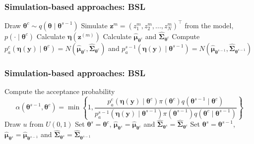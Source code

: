 \documentclass[12pt, compress]{beamer}
\begin{document}
\begin{frame}
	\frametitle{Simulation-based approaches: BSL}
\begin{algorithm}[H]
	\caption{Bayesian synthetic likelihood}\label{BSL0}
	\begin{algorithmic}
			\State Draw $\boldsymbol{\theta}^c\sim q(\boldsymbol{\theta}\mid \boldsymbol{\theta}^{s-1})$
				\State Simulate ${\boldsymbol z}^{m}=(z_{1}^{m},z_{2}^{m},...,z_{N}^{m})^{\top}$ from the model, $p(\cdot\mid{\boldsymbol{\theta} }^c)$
				\State Calculate $\boldsymbol{\eta}(\boldsymbol{z}^{(m)})$
			\EndFor 			 
			\State Calculate $\hat{\boldsymbol{\mu}}_{\boldsymbol{\theta}^c}$ and $\hat{\boldsymbol{\Sigma}}_{\boldsymbol{\theta}^c}$
			\State Compute $p_a^c(\boldsymbol{\eta}(\boldsymbol{y})\mid \boldsymbol{\theta}^c) = N(\hat{\boldsymbol{\mu}}_{\boldsymbol{\theta}^c}, \hat{\boldsymbol{\Sigma}}_{\boldsymbol{\theta}^c})$ and $p_a^{s-1}(\boldsymbol{\eta}(\boldsymbol{y})\mid \boldsymbol{\theta}^{s-1}) = N(\hat{\boldsymbol{\mu}}_{\boldsymbol{\theta}^{s-1}}, \hat{\boldsymbol{\Sigma}}_{\boldsymbol{\theta}^{s-1}})$
    \EndFor
	\end{algorithmic}
\end{algorithm}
\end{frame}

\begin{frame}
	\frametitle{Simulation-based approaches: BSL}
\begin{algorithm}[H]
	\caption{Bayesian synthetic likelihood}
	\begin{algorithmic}
			\State Compute the acceptance probability
			$$\alpha(\boldsymbol{\theta}^{s-1},\boldsymbol{\theta}^c)=\min\left\{1,\frac{p_a^c(\boldsymbol{\eta}(\boldsymbol{y})\mid \boldsymbol{\theta}^c)\pi(\boldsymbol{\theta}^c)q(\boldsymbol{\theta}^{s-1}\mid \boldsymbol{\theta}^{c})}{p_a^{s-1}(\boldsymbol{\eta}(\boldsymbol{y})\mid \boldsymbol{\theta}^{s-1})\pi(\boldsymbol{\theta}^{s-1})q(\boldsymbol{\theta}^{c}\mid \boldsymbol{\theta}^{s-1})}\right\}$$
			\State Draw $u$ from $U(0,1)$
			\If{$u<\alpha$}
				\State Set $\boldsymbol{\theta}^{s}=\boldsymbol{\theta}^{c}$, $\hat{\boldsymbol{\mu}}_{\boldsymbol{\theta}^{s}}=\hat{\boldsymbol{\mu}}_{\boldsymbol{\theta}^c}$ and $\hat{\boldsymbol{\Sigma}}_{\boldsymbol{\theta}^s}=\hat{\boldsymbol{\Sigma}}_{\boldsymbol{\theta}^c}$
			\Else
				\State Set $\boldsymbol{\theta}^{s}=\boldsymbol{\theta}^{s-1}$, $\hat{\boldsymbol{\mu}}_{\boldsymbol{\theta}^{s}}=\hat{\boldsymbol{\mu}}_{\boldsymbol{\theta}^{s-1}}$ and $\hat{\boldsymbol{\Sigma}}_{\boldsymbol{\theta}^s}=\hat{\boldsymbol{\Sigma}}_{\boldsymbol{\theta}^{s-1}}$
			\EndIf  
	\end{algorithmic}
\end{algorithm}

\end{frame}
\end{document}
